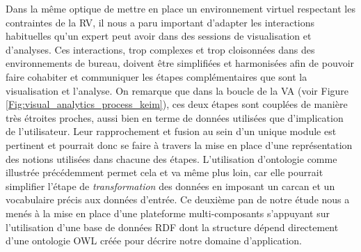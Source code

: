 Dans la même optique de mettre en place un environnement virtuel respectant les contraintes de la RV, il nous a paru important d'adapter les interactions habituelles qu'un expert peut avoir dans des sessions de visualisation et d'analyses. Ces interactions, trop complexes et trop cloisonnées dans des environnements de bureau, doivent être simplifiées et harmonisées afin de pouvoir faire cohabiter et communiquer les étapes complémentaires que sont la visualisation et l'analyse. On remarque que dans la boucle de la VA (voir Figure \ref{Fig:visual_analytics_process_keim}), ces deux étapes sont couplées de manière très étroites proches, aussi bien en terme de données utilisées que d'implication de l'utilisateur. Leur rapprochement et fusion au sein d'un unique module est pertinent et pourrait donc se faire à travers la mise en place d'une représentation des notions utilisées dans chacune des étapes. L'utilisation d'ontologie comme illustrée précédemment permet cela et va même plus loin, car elle pourrait simplifier l'étape de \textit{transformation} des données en imposant un carcan et un vocabulaire précis aux données d'entrée. Ce deuxième pan de notre étude nous a menés à la mise en place d'une plateforme multi-composants s'appuyant sur l'utilisation d'une base de données RDF dont la structure dépend directement d'une ontologie OWL créée pour décrire notre domaine d'application.














